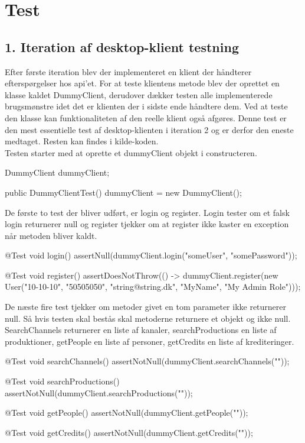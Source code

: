\section{Test}

\subsection{1. Iteration af desktop-klient testning}
Efter første iteration blev der implementeret en klient der håndterer efterspørgelser hos api'et. For at teste klientens metode blev der oprettet en klasse kaldet DummyClient, derudover dækker testen alle implementerede brugsmønstre idet det er klienten der i sidste ende håndtere dem. Ved at teste den klasse kan funktionaliteten af den reelle klient også afgøres. Denne test er den mest essentielle test af desktop-klienten i iteration 2 og er derfor den eneste medtaget. Resten kan findes i kilde-koden. \\

Testen starter med at oprette et dummyClient objekt i constructeren.

\begin{code}[caption=DummyClientTest.java, firstnumber=14]
DummyClient dummyClient;

public DummyClientTest() {
    dummyClient = new DummyClient();
}
\end{code}

De første to test der bliver udført, er login og register. Login tester om et falsk login returnerer null og register tjekker om at register ikke kaster en exception når metoden bliver kaldt.

\begin{code}[caption=DummyClientTest.java, firstnumber=20]
@Test
void login() {
    assertNull(dummyClient.login("someUser", "somePassword"));
}

@Test
void register() {
    assertDoesNotThrow(() -> dummyClient.register(new User("10-10-10", "50505050", "string@string.dk",
            "MyName", "My Admin Role")));
}
\end{code}

De næste fire test tjekker om metoder givet en tom parameter ikke returnerer null. Så hvis testen skal bestås skal metoderne returnere et objekt og ikke null. SearchChannels returnerer en liste af kanaler, searchProductions en liste af produktioner, getPeople en liste af personer, getCredits en liste af krediteringer.

\begin{code}[caption=DummyClientTest.java, firstnumber=31]
@Test
void searchChannels() {
    assertNotNull(dummyClient.searchChannels(""));
}

@Test
void searchProductions() {
    assertNotNull(dummyClient.searchProductions(""));
}

@Test
void getPeople() {
    assertNotNull(dummyClient.getPeople(""));
}

@Test
void getCredits() {
    assertNotNull(dummyClient.getCredits(""));
}
\end{code}

